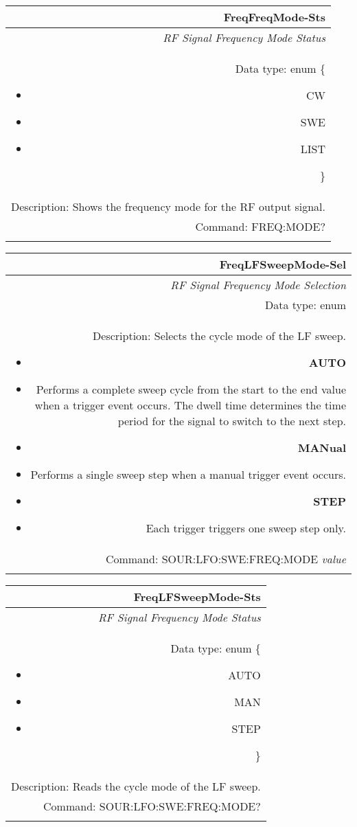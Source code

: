 \documentclass[openany]{article}
\begin{document}
		\begin{tabular}{N}
			\hline
			\bfseries FreqFreqMode-Sts \\ \hline
			\emph{RF Signal Frequency Mode Status} \\
			Data type: enum \{\begin{itemize}[noitemsep]
				\small
				\item[] CW
				\item[] SWE
				\item[] LIST
			\end{itemize}\} \\ 
			Description: Shows the frequency mode for the RF output signal. \\
			Command: FREQ:MODE? \\
			\\

		\end{tabular}


		\begin{tabular}{N}
			\hline
			\bfseries FreqLFSweepMode-Sel \\ \hline
			\emph{RF Signal Frequency Mode Selection} \\
			Data type: enum \\
			Description: Selects the cycle mode of the LF sweep.\begin{itemize}[noitemsep]
				\small
				\item[] \textbf{AUTO} 
				\item[] Performs a complete sweep cycle from the start to the end value when a trigger event occurs. The dwell time determines the time period for the signal to switch to the next step.
				\item[] \textbf{MANual}
				\item[] Performs a single sweep step when a manual trigger event occurs.
				\item[] \textbf{STEP}
				\item[] Each trigger triggers one sweep step only.
			\end{itemize} \\
			Command: SOUR:LFO:SWE:FREQ:MODE \emph{value} \\
			\\

		\end{tabular}


		\begin{tabular}{N}
			\hline
			\bfseries FreqLFSweepMode-Sts \\ \hline
			\emph{RF Signal Frequency Mode Status} \\
			Data type: enum \{\begin{itemize}[noitemsep]
				\small
				\item[] AUTO
				\item[] MAN
				\item[] STEP
			\end{itemize}\} \\ 
			Description: Reads the cycle mode of the LF sweep. \\
			Command: SOUR:LFO:SWE:FREQ:MODE? \\
			\\

		\end{tabular}
\end{document}
